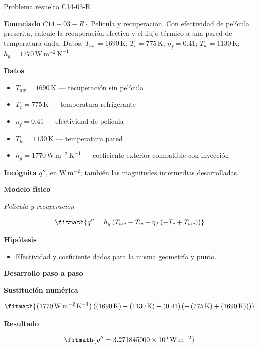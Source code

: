 \documentclass[10pt,openany]{book}
\begin{document}
\begin{studiumworked}{Problema resuelto C14-03-R}


\noindent\textbf{Enunciado}
\(C14-03-R \cdot\) Película y recuperación. Con efectividad de película prescrita, calcule la recuperación efectiva y el flujo térmico a una pared de temperatura dada. Datos: \(T_{aw}=1690\, \mathrm{K}\); \(T_c=775\, \mathrm{K}\); \(\eta_f=0.41\); \(T_w=1130\, \mathrm{K}\); \(h_g=1770\, \mathrm{W}\,\mathrm{m}^{-2}\,\mathrm{K}^{-1}\).

\noindent\textbf{Datos}
\begin{itemize}
\item $T_{aw} = 1690\,\mathrm{K}$ — recuperación sin película
\item $T_c = 775\,\mathrm{K}$ — temperatura refrigerante
\item $\eta_f = 0.41$ — efectividad de película
\item $T_w = 1130\,\mathrm{K}$ — temperatura pared
\item $h_g = 1770\,\mathrm{W}\,\mathrm{m}^{-2}\,\mathrm{K}^{-1}$ — coeficiente exterior compatible con inyección
\end{itemize}

\noindent\textbf{Incógnita}
$q''$, en $\mathrm{W\,m^{-2}}$; también las magnitudes intermedias desarrolladas.

\noindent\textbf{Modelo físico}

\noindent\textit{Película y recuperación}

\[
\fitmath{q''=h_g \left(T_{aw} - T_w - \eta_f \left(- T_c + T_{aw}\right)\right)}
\]

\noindent\textbf{Hipótesis}
\begin{itemize}
\item Efectividad y coeficiente dados para la misma geometría y punto.
\end{itemize}

\noindent\textbf{Desarrollo paso a paso}



\noindent\textbf{Sustitución numérica}

\[
\fitmath{\left(1770\,\mathrm{W}\,\mathrm{m}^{-2}\,\mathrm{K}^{-1}\right) \left(\left(1690\,\mathrm{K}\right) - \left(1130\,\mathrm{K}\right) - \left(0.41\right) \left(- \left(775\,\mathrm{K}\right) + \left(1690\,\mathrm{K}\right)\right)\right)}
\]

\noindent\textbf{Resultado}

\[
\fitmath{q''=3.271845000\times10^{5}\,\mathrm{W}\,\mathrm{m}^{-2}}
\]


\end{studiumworked}
\end{document}
